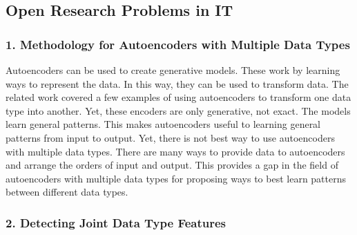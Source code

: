 \subsection{Open Research Problems in IT}

\subsubsection{1. Methodology for Autoencoders with Multiple Data Types}
Autoencoders can be used to create generative models. These work by learning ways to represent the data.  In this way, they can be used to transform data.  The related work covered a few examples of using autoencoders to transform one data type into another.  Yet, these encoders are only generative, not exact.  The models learn general patterns.  This makes autoencoders useful to learning general patterns from input to output.  Yet, there is not best way to use autoencoders with multiple data types.  There are many ways to provide data to autoencoders and arrange the orders of input and output.  This provides a gap in the field of autoencoders with multiple data types for proposing ways to best learn patterns between different data types.


\subsubsection{2. Detecting Joint Data Type Features}

